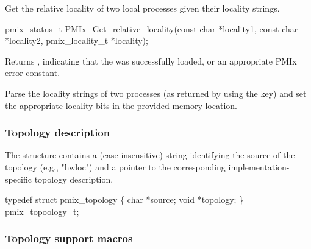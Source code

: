 \summary

Get the relative locality of two local processes given their locality strings.

\format

\cspecificstart
\begin{codepar}
pmix_status_t
PMIx_Get_relative_locality(const char *locality1,
                           const char *locality2,
                           pmix_locality_t *locality);
\end{codepar}
\cspecificend

\begin{arglist}
\end{arglist}

Returns , indicating that the  was successfully loaded, or an appropriate \ac{PMIx} error constant.

\descr

Parse the locality strings of two processes (as returned by  using the  key) and set the appropriate  locality bits in the provided memory location.

\subsubsection{Topology description}

The  structure contains a (case-insensitive)
string identifying the source of the topology (e.g., "hwloc") and a pointer
to the corresponding implementation-specific topology description.

\cspecificstart
\begin{codepar}
typedef struct pmix_topology \{
    char *source;
    void *topology;
\} pmix_topoology_t;
\end{codepar}
\cspecificend

\subsubsection{Topology support macros}

